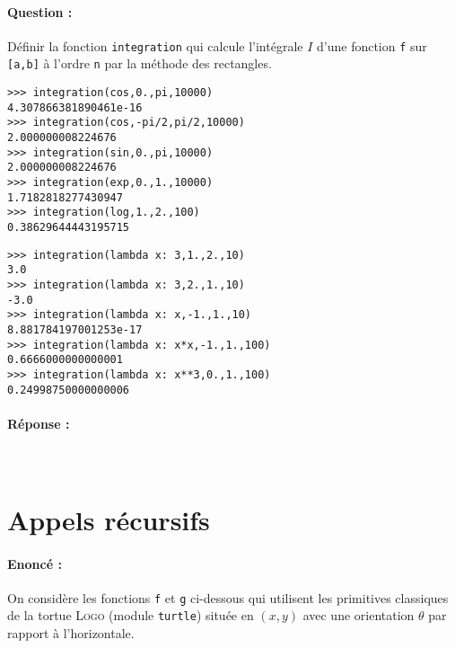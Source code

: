 \documentclass[11pt,a4paper]{article}
\begin{document}
	
\paragraph{Question :}
Définir la fonction \texttt{integration} qui calcule l'intégrale $I$ d'une fonction 
	\texttt{f} sur \texttt{[a,b]} à l'ordre \texttt{n} par la méthode des rectangles.
\vspace*{2mm}

\noindent
\begin{minipage}[t]{7cm}\footnotesize
\begin{Verbatim}
>>> integration(cos,0.,pi,10000)
4.307866381890461e-16
>>> integration(cos,-pi/2,pi/2,10000)
2.000000008224676
>>> integration(sin,0.,pi,10000)
2.000000008224676
>>> integration(exp,0.,1.,10000)
1.7182818277430947
>>> integration(log,1.,2.,100)
0.38629644443195715
\end{Verbatim}
\end{minipage}
\hfill
\begin{minipage}[t]{7cm}\footnotesize
\begin{Verbatim}
>>> integration(lambda x: 3,1.,2.,10)
3.0
>>> integration(lambda x: 3,2.,1.,10)
-3.0
>>> integration(lambda x: x,-1.,1.,10)
8.881784197001253e-17
>>> integration(lambda x: x*x,-1.,1.,100)
0.6666000000000001
>>> integration(lambda x: x**3,0.,1.,100)
0.24998750000000006
\end{Verbatim}
\end{minipage}

\newpage
\paragraph{Réponse :}\mbox{}\\
\noindent\framebox[0.99\textwidth]{$\rule{0cm}{22cm}$}

\section{Appels récursifs}
\vspace*{5mm}

\paragraph{Enoncé :} On considère les fonctions \texttt{f} et \texttt{g} ci-dessous qui utilisent
les primitives classiques de la tortue \textsc{Logo} (module \texttt{turtle}) située en $(x,y)$
avec une orientation $\theta$ par rapport à l'horizontale.
\end{document}

